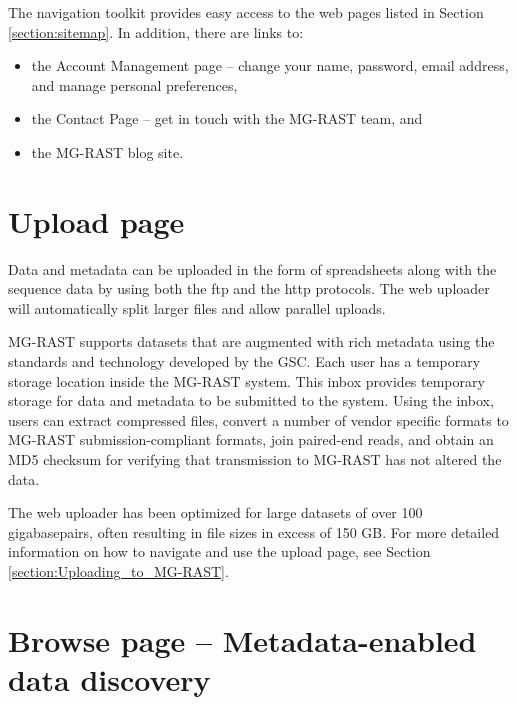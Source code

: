 \documentclass[12pt,fullpage]{report}
\begin{document}
The navigation toolkit provides easy access to the web pages listed in Section \ref{section:sitemap}. In addition, there are links to:
\begin{itemize}
\item the Account Management page -- change your name, password, email address, and manage personal preferences,

\item the Contact Page -- get in touch with the MG-RAST team, and

\item the MG-RAST blog site.
\end{itemize}
\section{Upload page}

Data and metadata can be uploaded in the form of spreadsheets along with the sequence data by using both the ftp and the http protocols. The web uploader will automatically split larger files and allow parallel uploads.

MG-RAST supports datasets that are augmented with rich metadata using the standards and technology developed by the GSC.
Each user has a temporary storage location inside the MG-RAST system. This inbox provides temporary storage for data and metadata to be submitted to the system. Using the inbox, users can extract compressed files, convert a number of vendor specific formats to MG-RAST submission-compliant formats, join paired-end reads, and obtain an \gls{MD5} checksum for verifying that transmission to MG-RAST has not altered the data.

The web uploader has been optimized for large datasets of over 100 gigabasepairs, often resulting in file sizes in excess of 150 GB.  For more detailed information on how to navigate and use the upload page, see Section \ref{section:Uploading_to_MG-RAST}.  
\section{Browse page -- Metadata-enabled data discovery}
\end{document}
